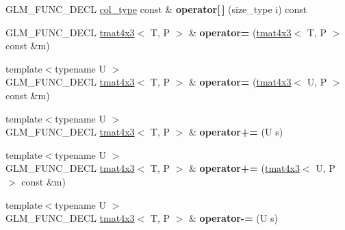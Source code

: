 \begin{DoxyCompactItemize}
\item 
G\+L\+M\+\_\+\+F\+U\+N\+C\+\_\+\+D\+E\+CL \hyperlink{structglm_1_1detail_1_1tvec3}{col\+\_\+type} const \& {\bfseries operator\mbox{[}$\,$\mbox{]}} (size\+\_\+type i) const \hypertarget{structglm_1_1detail_1_1tmat4x3_a8dd9a56f0f1aea3919317bb25486cae1}{}\label{structglm_1_1detail_1_1tmat4x3_a8dd9a56f0f1aea3919317bb25486cae1}

\item 
G\+L\+M\+\_\+\+F\+U\+N\+C\+\_\+\+D\+E\+CL \hyperlink{structglm_1_1detail_1_1tmat4x3}{tmat4x3}$<$ T, P $>$ \& {\bfseries operator=} (\hyperlink{structglm_1_1detail_1_1tmat4x3}{tmat4x3}$<$ T, P $>$ const \&m)\hypertarget{structglm_1_1detail_1_1tmat4x3_a7d7570c16297f45b77cda4686e2d7725}{}\label{structglm_1_1detail_1_1tmat4x3_a7d7570c16297f45b77cda4686e2d7725}

\item 
{\footnotesize template$<$typename U $>$ }\\G\+L\+M\+\_\+\+F\+U\+N\+C\+\_\+\+D\+E\+CL \hyperlink{structglm_1_1detail_1_1tmat4x3}{tmat4x3}$<$ T, P $>$ \& {\bfseries operator=} (\hyperlink{structglm_1_1detail_1_1tmat4x3}{tmat4x3}$<$ U, P $>$ const \&m)\hypertarget{structglm_1_1detail_1_1tmat4x3_a78d228bf3b4923aaf3514d63d4bb4afd}{}\label{structglm_1_1detail_1_1tmat4x3_a78d228bf3b4923aaf3514d63d4bb4afd}

\item 
{\footnotesize template$<$typename U $>$ }\\G\+L\+M\+\_\+\+F\+U\+N\+C\+\_\+\+D\+E\+CL \hyperlink{structglm_1_1detail_1_1tmat4x3}{tmat4x3}$<$ T, P $>$ \& {\bfseries operator+=} (U s)\hypertarget{structglm_1_1detail_1_1tmat4x3_a1708ebf2fc22d00a114f77794da8bc22}{}\label{structglm_1_1detail_1_1tmat4x3_a1708ebf2fc22d00a114f77794da8bc22}

\item 
{\footnotesize template$<$typename U $>$ }\\G\+L\+M\+\_\+\+F\+U\+N\+C\+\_\+\+D\+E\+CL \hyperlink{structglm_1_1detail_1_1tmat4x3}{tmat4x3}$<$ T, P $>$ \& {\bfseries operator+=} (\hyperlink{structglm_1_1detail_1_1tmat4x3}{tmat4x3}$<$ U, P $>$ const \&m)\hypertarget{structglm_1_1detail_1_1tmat4x3_a2b0c10c2d6d2183c6dc36027028fa8bd}{}\label{structglm_1_1detail_1_1tmat4x3_a2b0c10c2d6d2183c6dc36027028fa8bd}

\item 
{\footnotesize template$<$typename U $>$ }\\G\+L\+M\+\_\+\+F\+U\+N\+C\+\_\+\+D\+E\+CL \hyperlink{structglm_1_1detail_1_1tmat4x3}{tmat4x3}$<$ T, P $>$ \& {\bfseries operator-\/=} (U s)\hypertarget{structglm_1_1detail_1_1tmat4x3_afe60f638ecc619992856f0775383be8c}{}\label{structglm_1_1detail_1_1tmat4x3_afe60f638ecc619992856f0775383be8c}


\end{DoxyCompactItemize}
